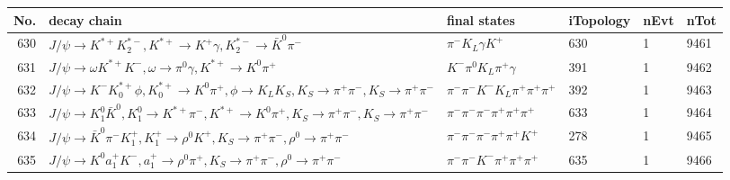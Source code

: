 \begin{table}[htbp] 
\begin{center}
\begin{small}
\begin{tabular}{rlllll}\hline\hline
 No. & decay chain & final states &  iTopology & nEvt & nTot \\\hline
630&$J/\psi       \rightarrow K^{*+}         K_2^{*-}       , K^{*+}          \rightarrow K^{+}          \gamma       , K_2^{*-}        \rightarrow \bar{K}^{0}   \pi^{-}        $&$\pi^{-}        K_{L}          \gamma       K^{+}          $&  630&    1& 9461\\
631&$J/\psi       \rightarrow \omega         K^{*+}         K^{-}          , \omega          \rightarrow \pi^{0}        \gamma       , K^{*+}          \rightarrow K^{0}          \pi^{+}        $&$K^{-}          \pi^{0}        K_{L}          \pi^{+}        \gamma       $&  391&    1& 9462\\
632&$J/\psi       \rightarrow K^{-}          K_{0}^{*+}     \phi           , K_{0}^{*+}      \rightarrow K^{0}          \pi^{+}        , \phi            \rightarrow K_{L}          K_{S}          , K_{S}           \rightarrow \pi^{+}        \pi^{-}        , K_{S}           \rightarrow \pi^{+}        \pi^{-}        $&$\pi^{-}        \pi^{-}        K^{-}          K_{L}          \pi^{+}        \pi^{+}        \pi^{+}        $&  392&    1& 9463\\
633&$J/\psi       \rightarrow K_1^{0}        \bar{K}^{0}   , K_1^{0}         \rightarrow K^{*+}         \pi^{-}        , K^{*+}          \rightarrow K^{0}          \pi^{+}        , K_{S}           \rightarrow \pi^{+}        \pi^{-}        , K_{S}           \rightarrow \pi^{+}        \pi^{-}        $&$\pi^{-}        \pi^{-}        \pi^{-}        \pi^{+}        \pi^{+}        \pi^{+}        $&  633&    1& 9464\\
634&$J/\psi       \rightarrow \bar{K}^{0}   \pi^{-}        K_1^{+}        , K_1^{+}         \rightarrow \rho^{0}      K^{+}          , K_{S}           \rightarrow \pi^{+}        \pi^{-}        , \rho^{0}       \rightarrow \pi^{+}        \pi^{-}        $&$\pi^{-}        \pi^{-}        \pi^{-}        \pi^{+}        \pi^{+}        K^{+}          $&  278&    1& 9465\\
635&$J/\psi       \rightarrow K^{0}          a_{1}^{+}      K^{-}          , a_{1}^{+}       \rightarrow \rho^{0}      \pi^{+}        , K_{S}           \rightarrow \pi^{+}        \pi^{-}        , \rho^{0}       \rightarrow \pi^{+}        \pi^{-}        $&$\pi^{-}        \pi^{-}        K^{-}          \pi^{+}        \pi^{+}        \pi^{+}        $&  635&    1& 9466\\

\end{tabular}
\end{small}
\end{center}
\end{table}
